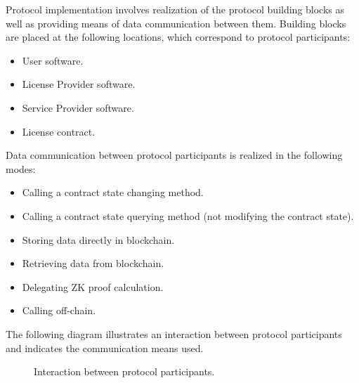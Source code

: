 
Protocol implementation involves realization of the protocol building blocks as well as providing means of data communication between them. Building blocks are placed at the following locations, which correspond to protocol participants:

\begin{itemize}%
	\item User software.
	\item License Provider software.
	\item Service Provider software.
	\item License contract.
\end{itemize}

\begin{flushleft}
	Data communication between protocol participants is realized in the following modes:
\end{flushleft}

\begin{itemize}%
	\item Calling a contract state changing method.
	\item Calling a contract state querying method (not modifying the contract state).
	\item Storing data directly in blockchain.
	\item Retrieving data from blockchain.
	\item Delegating ZK proof calculation.
	\item Calling off-chain.
\end{itemize}

\begin{flushleft}
	The following diagram illustrates an interaction between protocol participants and indicates the communication means used.
\end{flushleft}

\begin{figure}[h!]
	\centering
	\caption{Interaction between protocol participants.}
	\label{fig:implementation}
\end{figure}

